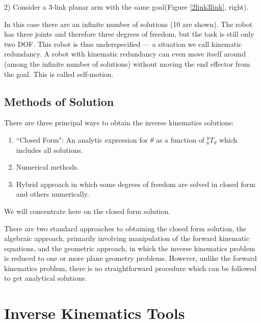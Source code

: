2) Consider a 3-link planar arm with the same goal(Figure \ref{2link3link}, right).



In this case there are an infinite number of solutions (10 are shown).  The robot has three joints and therefore three degrees of freedom, but the task is still only two DOF.   This robot is thus underspecified --- a situation we call kinematic redundancy.  A robot with kinematic redundancy
can even move itself around (among the infinite number of solutions) without moving the end effector from the goal.  This is called self-motion.




\subsection{Methods of Solution}

There are three principal ways to obtain the inverse kinematics solutions:

\begin{enumerate}
	\item ``Closed Form":  An analytic expression for $\theta$ as a function of $^0_6T_d$ which includes all solutions.

	\item Numerical methods.

	\item Hybrid approach in which some degrees of freedom are solved in closed form and others numerically.

\end{enumerate}

We will concentrate here on the closed form solution.


There are two standard approaches to obtaining the closed form solution, the algebraic approach, primarily involving manipulation of the forward kinematic equations, and the geometric approach, in which the inverse kinematics problem is reduced to one or more plane geometry problems. However, unlike the forward kinematics problem, there is no straightforward procedure which can be followed to get analytical solutions.

%
%
\section{Inverse Kinematics Tools}
